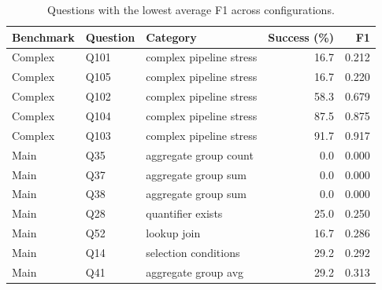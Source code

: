 \begin{table}[htbp]
\centering
\small
\caption{Questions with the lowest average F1 across configurations.}
\label{tab:difficult-questions}
\begin{tabular}{lllrr}
\toprule
Benchmark & Question & Category & Success (\%) & F1 \\
\midrule
Complex & Q101 & complex pipeline stress & 16.7 & 0.212 \\
Complex & Q105 & complex pipeline stress & 16.7 & 0.220 \\
Complex & Q102 & complex pipeline stress & 58.3 & 0.679 \\
Complex & Q104 & complex pipeline stress & 87.5 & 0.875 \\
Complex & Q103 & complex pipeline stress & 91.7 & 0.917 \\
Main & Q35 & aggregate group count & 0.0 & 0.000 \\
Main & Q37 & aggregate group sum & 0.0 & 0.000 \\
Main & Q38 & aggregate group sum & 0.0 & 0.000 \\
Main & Q28 & quantifier exists & 25.0 & 0.250 \\
Main & Q52 & lookup join & 16.7 & 0.286 \\
Main & Q14 & selection conditions & 29.2 & 0.292 \\
Main & Q41 & aggregate group avg & 29.2 & 0.313 \\
\bottomrule
\end{tabular}
\end{table}
